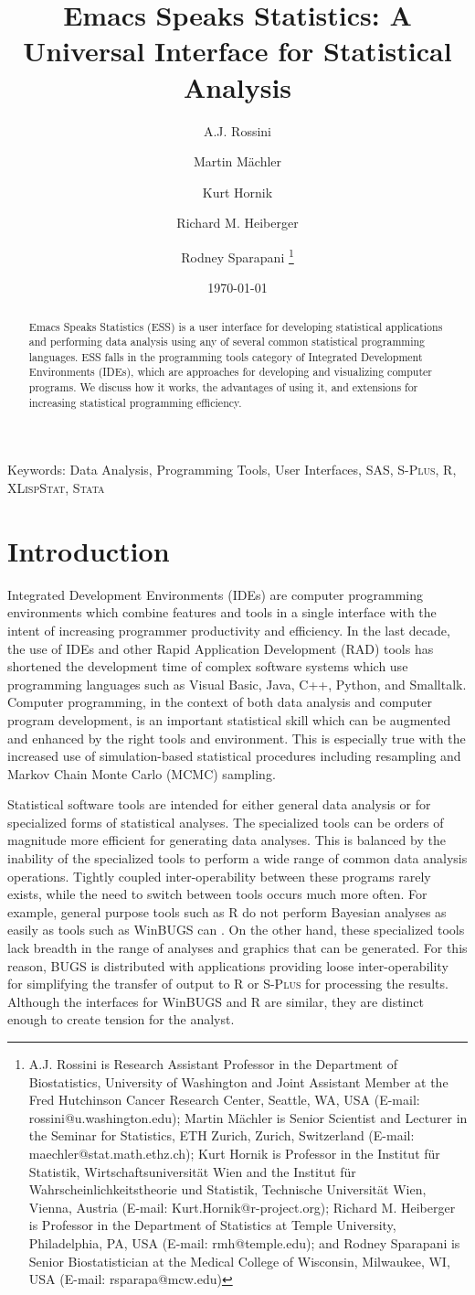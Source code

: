 \documentclass{article}
\title{Emacs Speaks Statistics: A Universal Interface for
  Statistical Analysis}
\author{A.J. Rossini \and Martin M{\"a}chler \and Kurt Hornik \and Richard
  M. Heiberger \and Rodney Sparapani \footnote{%
    A.J. Rossini is Research Assistant Professor in the Department of
    Biostatistics, University of Washington and Joint Assistant Member at
    the Fred Hutchinson Cancer Research Center, Seattle, WA, USA
    (E-mail: rossini@u.washington.edu);
    Martin M{\"a}chler is Senior Scientist and Lecturer in the Seminar for
    Statistics, ETH Zurich, Zurich, Switzerland
    (E-mail: maechler@stat.math.ethz.ch);
    Kurt Hornik is Professor in the Institut f{\"u}r Statistik,
    Wirtschaftsuniversit{\"a}t Wien and the Institut f{\"u}r
    Wahrscheinlichkeitstheorie und Statistik, Technische Universit{\"a}t
    Wien, Vienna, Austria (E-mail: Kurt.Hornik@r-project.org);
    Richard M. Heiberger is Professor in the Department of Statistics at
    Temple University, Philadelphia, PA, USA (E-mail: rmh@temple.edu);
    and Rodney Sparapani is Senior Biostatistician at the Medical College
    of Wisconsin, Milwaukee, WI, USA (E-mail: rsparapa@mcw.edu)}}
\date{\today}
\newcommand*{\Splus}{\textsc{S-Plus}}
\newcommand*{\XLispStat}{\textsc{XLispStat}}
\newcommand*{\Stata}{\textsc{Stata}}
\begin{document}
\maketitle

\begin{abstract}
  Emacs Speaks Statistics (ESS) is a user interface for developing
  statistical applications and performing data analysis using any of
  several common statistical programming languages.  ESS falls in the
  programming tools category of Integrated Development Environments
  (IDEs), which are approaches for developing and visualizing computer
  programs.  We discuss how it works, the advantages of using it, and
  extensions for increasing statistical programming efficiency.
\end{abstract}

\noindent Keywords: Data Analysis, Programming Tools, User Interfaces, SAS,
\Splus, R, \XLispStat, \Stata

\baselineskip=2pc

\section{Introduction}
\label{sec:intro}

Integrated Development Environments (IDEs) are computer programming
environments which combine features and tools in a single interface
with the intent of increasing programmer productivity and efficiency.
In the last decade, the use of IDEs and other Rapid Application
Development (RAD) tools has shortened the development time of complex
software systems which use programming languages such as Visual Basic,
Java, C++, Python, and Smalltalk.  Computer programming, in the
context of both data analysis and computer program development, is an
important statistical skill which can be augmented and enhanced by the
right tools and environment.  This is especially true with the
increased use of simulation-based statistical procedures including
resampling and Markov Chain Monte Carlo (MCMC) sampling.

Statistical software tools are intended for either general data
analysis or for specialized forms of statistical analyses.  The
specialized tools can be orders of magnitude more efficient for
generating data analyses.  This is balanced by the inability of the
specialized tools to perform a wide range of common data analysis
operations.  Tightly coupled inter-operability between these programs
rarely exists, while the need to switch between tools occurs much more
often.  For example, general purpose tools such as R
\citep{ihak:gent:1996} do not perform Bayesian analyses as easily as
tools such as WinBUGS can \citep{SpieThomBest:1999}.  On the other
hand, these specialized tools lack breadth in the range of analyses
and graphics that can be generated.  For this reason, BUGS is
distributed with applications providing loose inter-operability for
simplifying the transfer of output to R or \Splus{} for processing the
results.  Although the interfaces for WinBUGS and R are similar, they
are distinct enough to create tension for the analyst.
\end{document}
